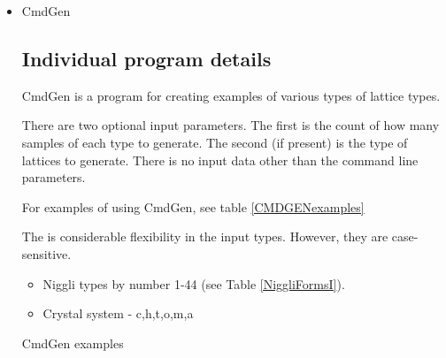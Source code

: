 \documentclass[preprint]{iucr}              %
\numberwithin{equation}{section}
\begin{document}
	\begin{itemize}
	\item{CmdGen}
	
	\subsection{Individual program details}

CmdGen is a program for creating examples of various types of lattice types.
		
There are two optional input parameters. The first is the count
of how many samples of each type to generate. The second (if present) is
the type of lattices to generate.  There is no input data
other than the command line parameters.

For examples of using CmdGen, see table \ref{CMDGENexamples}


The is considerable flexibility in the input types. However, they
are case-sensitive.


\begin{itemize}
	\item Niggli types by number 1-44 (see Table \ref{NiggliFormsI}).
	\item Crystal system - c,h,t,o,m,a
\end{itemize}


\vspace{2pt}

\begin{table}
		
		\label{CMDGENexamples}
		\caption{CmdGen examples}


\end{table}
\end{itemize}
\end{document}
